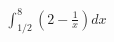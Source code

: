 \documentclass[preview]{standalone}
\begin{document}
\begin{align*}
\int_{1/2}^{8} \left(2 - \frac{1}{x}\right) dx
\end{align*}
\end{document}
